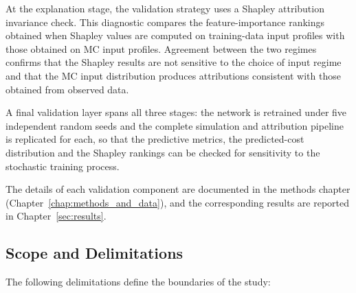 At the explanation stage, the validation strategy uses a Shapley
attribution invariance check.  This diagnostic compares the
feature-importance rankings obtained when Shapley values are computed on
training-data input profiles with those obtained on MC input
profiles.  Agreement between the two regimes confirms that the Shapley
results are not sensitive to the choice of input regime and that the
MC input distribution produces attributions consistent with
those obtained from observed data.

A final validation layer spans all three stages: the network is
retrained under five independent random seeds and the complete
simulation and attribution pipeline is replicated for each, so that
the predictive metrics, the predicted-cost distribution and the
Shapley rankings can be checked for sensitivity to the stochastic
training process.

The details of each validation component are documented in the methods
chapter (Chapter~\ref{chap:methods_and_data}), and the corresponding
results are reported in Chapter~\ref{sec:results}.


\subsection{Scope and Delimitations}
\label{sec:scope_delimitations}

The following delimitations define the boundaries of the study:


